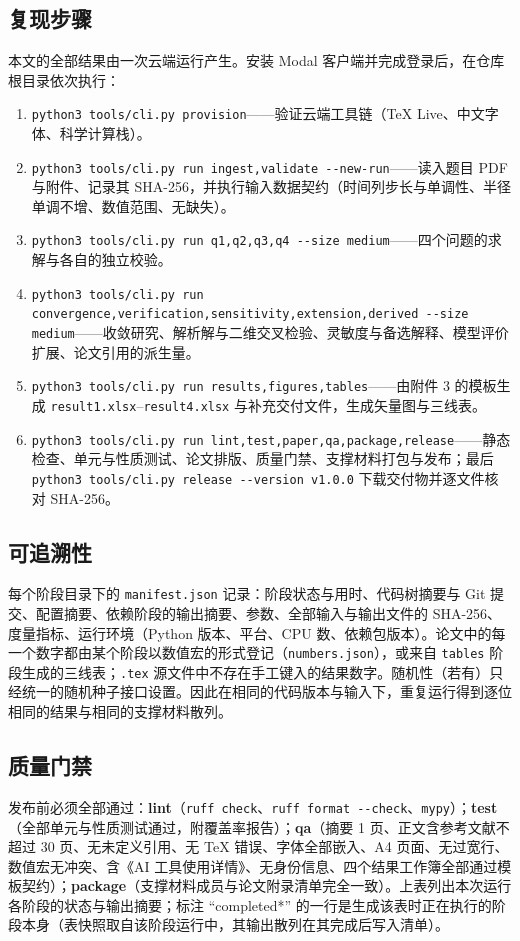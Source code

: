 \subsection*{复现步骤}
本文的全部结果由一次云端运行产生。安装 Modal 客户端并完成登录后，在仓库根目录依次执行：

\begin{enumerate}[leftmargin=*,itemsep=0.15em]
  \item \texttt{python3 tools/cli.py provision}——验证云端工具链（\TeX{} Live、中文字体、科学计算栈）。
  \item \texttt{python3 tools/cli.py run ingest,validate -{}-new-run}——读入题目 PDF 与附件、记录其 SHA-256，并执行输入数据契约（时间列步长与单调性、半径单调不增、数值范围、无缺失）。
  \item \texttt{python3 tools/cli.py run q1,q2,q3,q4 -{}-size medium}——四个问题的求解与各自的独立校验。
  \item \texttt{python3 tools/cli.py run convergence,\allowbreak{}verification,\allowbreak{}sensitivity,\allowbreak{}extension,\allowbreak{}derived -{}-size medium}——收敛研究、解析解与二维交叉检验、灵敏度与备选解释、模型评价扩展、论文引用的派生量。
  \item \texttt{python3 tools/cli.py run results,figures,tables}——由附件 3 的模板生成 \nolinkurl{result1.xlsx}--\nolinkurl{result4.xlsx} 与补充交付文件，生成矢量图与三线表。
  \item \texttt{python3 tools/cli.py run lint,test,paper,qa,package,release}——静态检查、单元与性质测试、论文排版、质量门禁、支撑材料打包与发布；最后 \texttt{python3 tools/cli.py release -{}-version v1.0.0} 下载交付物并逐文件核对 SHA-256。
\end{enumerate}

\subsection*{可追溯性}
每个阶段目录下的 \nolinkurl{manifest.json} 记录：阶段状态与用时、代码树摘要与 Git 提交、配置摘要、依赖阶段的输出摘要、参数、全部输入与输出文件的 SHA-256、度量指标、运行环境（Python 版本、平台、CPU 数、依赖包版本）。论文中的每一个数字都由某个阶段以数值宏的形式登记（\nolinkurl{numbers.json}），或来自 \nolinkurl{tables} 阶段生成的三线表；\nolinkurl{.tex} 源文件中不存在手工键入的结果数字。随机性（若有）只经统一的随机种子接口设置。因此在相同的代码版本与输入下，重复运行得到逐位相同的结果与相同的支撑材料散列。

\subsection*{质量门禁}
发布前必须全部通过：\textbf{lint}（\texttt{ruff check}、\texttt{ruff format -{}-check}、\texttt{mypy}）；\textbf{test}（全部单元与性质测试通过，附覆盖率报告）；\textbf{qa}（摘要 1 页、正文含参考文献不超过 30 页、无未定义引用、无 \TeX{} 错误、字体全部嵌入、A4 页面、无过宽行、数值宏无冲突、含《AI 工具使用详情》、无身份信息、四个结果工作簿全部通过模板契约）；\textbf{package}（支撑材料成员与论文附录清单完全一致）。上表列出本次运行各阶段的状态与输出摘要；标注 ``completed*'' 的一行是生成该表时正在执行的阶段本身（表快照取自该阶段运行中，其输出散列在其完成后写入清单）。
